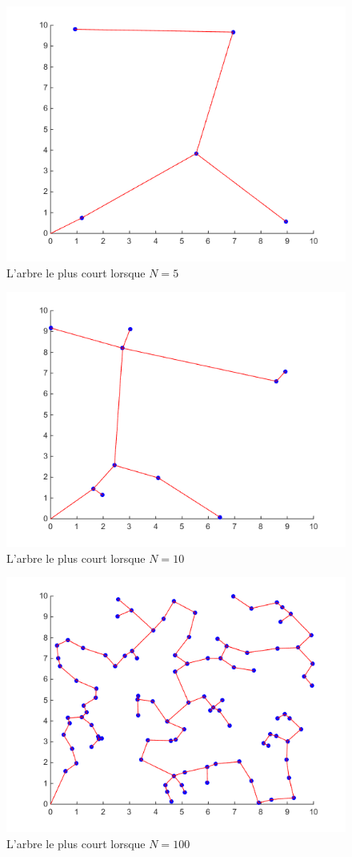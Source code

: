 \documentclass[10pt,a4paper]{article}
\begin{document}
\begin{figure}[!ht]
    \centering
    \includegraphics[width=0.8\linewidth]{img/n=5_maxX=10_maxY=10.png}
    \caption{L'arbre le plus court lorsque $N=5$}
\end{figure}

\begin{figure}[!ht]
    \centering
    \includegraphics[width=0.8\linewidth]{img/n=10_maxX=10_maxY=10.png}
    \caption{L'arbre le plus court lorsque $N=10$}
\end{figure}

\begin{figure}[!ht]
    \centering
    \includegraphics[width=0.8\linewidth]{img/n=100_maxX=10_maxY=10.png}
    \caption{L'arbre le plus court lorsque $N=100$}
\end{figure}
\end{document}
